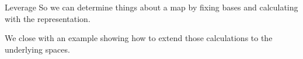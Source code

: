 \documentclass[9pt,t]{beamer}
\begin{document}
\begin{frame}{Leverage}
So
we can determine things about a map by fixing bases and 
calculating with the representation.

We close with an example showing how to extend those calculations
to the underlying spaces.


\end{frame}
\end{document}
